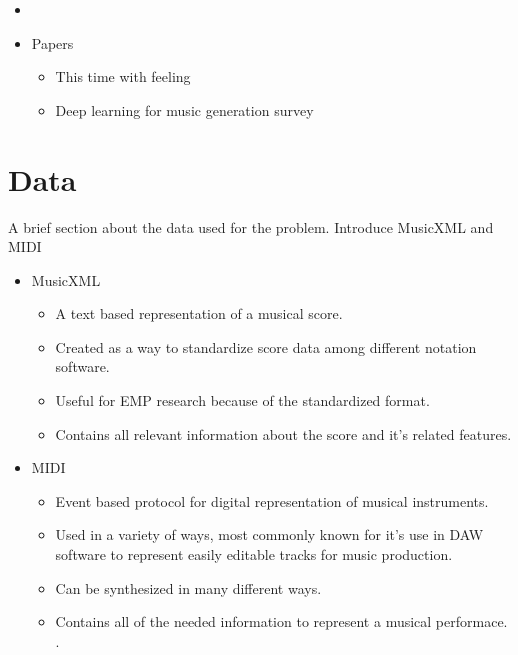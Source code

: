 \begin{itemize}
\begin{itemize}
        \item {}
        \item Papers 
        \begin{itemize}
            \item This time with feeling \cite{oore2020time}
            \item Deep learning for music generation survey \cite{ji2020comprehensive}
        \end{itemize}
    \end{itemize}
\end{itemize}

\section{Data}
A brief section about the data used for the problem. Introduce MusicXML and MIDI
\begin{itemize}
    \item MusicXML
    \begin{itemize}
        \item A text based representation of a musical score. 
        \item Created as a way to standardize score data among different notation software. 
        \item Useful for EMP research because of the standardized format. 
        \item Contains all relevant information about the score and it's related features. 
    \end{itemize}
    \item MIDI 
    \begin{itemize}
        \item Event based protocol for digital representation of musical instruments. 
        \item Used in a variety of ways, most commonly known for it's use in DAW software to represent easily editable tracks for music production. 
        \item Can be synthesized in many different ways. 
        \item Contains all of the needed information to represent a musical performace. . 
    \end{itemize}
    
\end{itemize}



